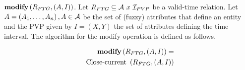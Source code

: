 \begin{definition}
\emph{$\mbox{\textbf{modify}} \left( R_{FTG}, \left( A, I \right) \right)$}. 
Let $R_{FTG} \subseteq \mathcal{A} \  x\  \mathcal{I}_{PVP}$ be a  valid-time relation. Let  $A=\left(A_1, \ldots, A_n \right), A \in \mathcal{A}$ be the set of (fuzzy) attributes that define an entity and the PVP given by $I = \left(X, Y\right)$ the set of attributes defining the time interval. The algorithm for the modify operation is defined as follows.
\end{definition}


\begin{align}
\label{eq:modify-fuzzy-temporal}
\mbox{\textbf{modify}} \left( R_{FTG}, \left( A, I \right) \right) =\\
\nonumber
\mbox{ Close-current }\left(R_{FTG}, \left(A, I\right) \right) 
\end{align}

